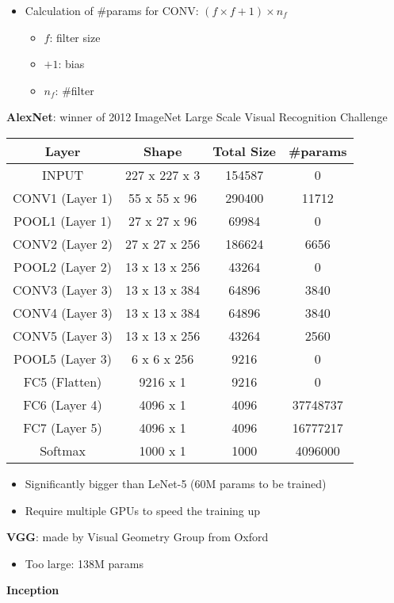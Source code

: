 \documentclass[
]{book}
\providecommand{\tightlist}{%
  \setlength{\itemsep}{0pt}\setlength{\parskip}{0pt}}
\begin{document}
\begin{itemize}
\tightlist
\item
  Calculation of \#params for CONV: \((f\times f+1)\times n_f\)

  \begin{itemize}
  \tightlist
  \item
    \(f\): filter size
  \item
    \(+1\): bias
  \item
    \(n_f\): \#filter
  \end{itemize}
\end{itemize}

\textbf{AlexNet}: winner of 2012 ImageNet Large Scale Visual Recognition
Challenge

\begin{longtable}[]{@{}cccc@{}}
\toprule
Layer & Shape & Total Size & \#params\tabularnewline
\midrule
\endhead
INPUT & 227 x 227 x 3 & 154587 & 0\tabularnewline
CONV1 (Layer 1) & 55 x 55 x 96 & 290400 & 11712\tabularnewline
POOL1 (Layer 1) & 27 x 27 x 96 & 69984 & 0\tabularnewline
CONV2 (Layer 2) & 27 x 27 x 256 & 186624 & 6656\tabularnewline
POOL2 (Layer 2) & 13 x 13 x 256 & 43264 & 0\tabularnewline
CONV3 (Layer 3) & 13 x 13 x 384 & 64896 & 3840\tabularnewline
CONV4 (Layer 3) & 13 x 13 x 384 & 64896 & 3840\tabularnewline
CONV5 (Layer 3) & 13 x 13 x 256 & 43264 & 2560\tabularnewline
POOL5 (Layer 3) & 6 x 6 x 256 & 9216 & 0\tabularnewline
FC5 (Flatten) & 9216 x 1 & 9216 & 0\tabularnewline
FC6 (Layer 4) & 4096 x 1 & 4096 & 37748737\tabularnewline
FC7 (Layer 5) & 4096 x 1 & 4096 & 16777217\tabularnewline
Softmax & 1000 x 1 & 1000 & 4096000\tabularnewline
\bottomrule
\end{longtable}

\begin{itemize}
\tightlist
\item
  Significantly bigger than LeNet-5 (60M params to be trained)
\item
  Require multiple GPUs to speed the training up
\end{itemize}

\textbf{VGG}: made by Visual Geometry Group from Oxford

\begin{itemize}
\tightlist
\item
  Too large: 138M params
\end{itemize}

\textbf{Inception}
\end{document}
